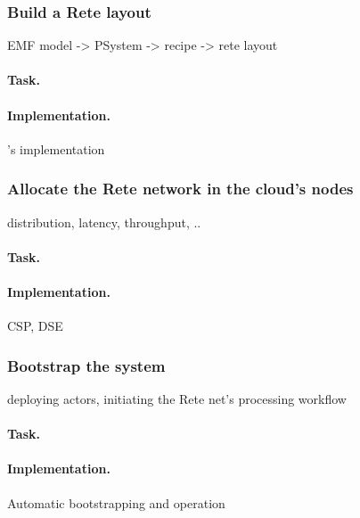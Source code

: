 \subsubsection{Build a Rete layout}

EMF model -> PSystem -> recipe -> rete layout

\paragraph{Task.}  

\paragraph{Implementation.} \eiq{}'s implementation 

\subsubsection{Allocate the Rete network in the cloud's nodes}

distribution, latency, throughput, .. 

\paragraph{Task.} 

\paragraph{Implementation.} CSP, DSE~\cite{DSE11}

\subsubsection{Bootstrap the system}

deploying actors, initiating the Rete net's processing workflow

\paragraph{Task.} 

\paragraph{Implementation.} Automatic bootstrapping and operation 




